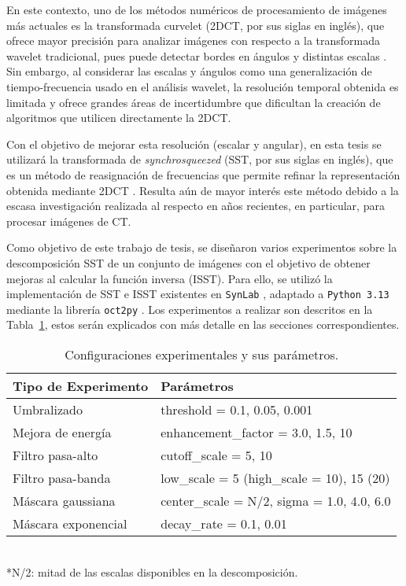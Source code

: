 En este contexto, uno de los métodos numéricos de procesamiento de imágenes más actuales es la transformada curvelet (2DCT, por sus siglas en inglés), que ofrece mayor precisión para analizar imágenes con respecto a la transformada wavelet tradicional, pues puede detectar bordes en ángulos y distintas escalas \cite{FastCurveletTransform}. Sin embargo, al considerar las escalas y ángulos como una generalización de tiempo-frecuencia usado en el análisis wavelet, la resolución temporal obtenida es limitada y ofrece grandes áreas de incertidumbre que dificultan la creación de algoritmos que utilicen directamente la 2DCT.

Con el objetivo de mejorar esta resolución (escalar y angular), en esta tesis se utilizará la transformada de \emph{synchrosqueezed} (SST, por sus siglas en inglés), que es un método de reasignación de frecuencias que permite refinar la representación obtenida mediante 2DCT \cite{SynchrosqueezedCurveletTransform}. Resulta aún de mayor interés este método debido a la escasa investigación realizada al respecto en años recientes, en particular, para procesar imágenes de CT.

Como objetivo de este trabajo de tesis, se diseñaron varios experimentos sobre la descomposición SST de un conjunto de imágenes con el objetivo de obtener mejoras al calcular la función inversa (ISST). Para ello, se utilizó la implementación de SST e ISST existentes en \texttt{SynLab} \cite{SynchrosqueezedCurveletTransform,SynchrosqueezedCurveletTransform_SynLab}, adaptado a \texttt{Python 3.13} mediante la librería \texttt{oct2py} \cite{oct2py}. Los experimentos a realizar son descritos en la Tabla~\ref{tab:experimentos}, estos serán explicados con más detalle en las secciones correspondientes.

\begin{table}[h]
    \centering
    \caption{Configuraciones experimentales y sus parámetros.}
    \label{tab:experimentos}
    \begin{tabular}{>{\raggedright}p{4cm}p{6cm}}
    \toprule
    \textbf{Tipo de Experimento} & \textbf{Parámetros} \\ 
    \midrule
    Umbralizado & threshold = 0.1, 0.05, 0.001 \\
    \midrule
    Mejora de energía & enhancement\_factor = 3.0, 1.5, 10 \\
    \midrule
    Filtro pasa-alto & cutoff\_scale = 5, 10 \\
    \midrule
    Filtro pasa-banda & low\_scale = 5 (high\_scale = 10), 15 (20) \\
    \midrule
    Máscara gaussiana & center\_scale = N/2, sigma = 1.0, 4.0, 6.0 \\
    \midrule
    Máscara exponencial & decay\_rate = 0.1, 0.01 \\
    \bottomrule
    \end{tabular}
    \footnotesize{\\*N/2: mitad de las escalas disponibles en la descomposición.}
\end{table}

